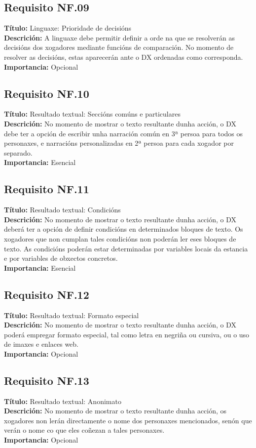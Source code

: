 \subsection{Requisito NF.09}
{\bf Título:} Linguaxe: Prioridade de decisións\\
{\bf Descrición:} A linguaxe debe permitir definir a orde na que se resolverán as decisións dos xogadores mediante funcións de comparación. No momento de resolver as decisións, estas aparecerán ante o DX ordenadas como corresponda.\\
{\bf Importancia:} Opcional

\subsection{Requisito NF.10}
{\bf Título:} Resultado textual: Seccións comúns e particulares\\
{\bf Descrición:} No momento de mostrar o texto resultante dunha acción, o DX debe ter a opción de escribir unha narración común en 3ª persoa para todos os personaxes, e narracións personalizadas en 2ª persoa para cada xogador por separado.\\
{\bf Importancia:} Esencial

\subsection{Requisito NF.11}
{\bf Título:} Resultado textual: Condicións\\
{\bf Descrición:} No momento de mostrar o texto resultante dunha acción, o DX deberá ter a opción de definir condicións en determinados bloques de texto. Os xogadores que non cumplan tales condicións non poderán ler eses bloques de texto. As condicións poderán estar determinadas por variables locais da estancia e por variables de obxectos concretos.\\
{\bf Importancia:} Esencial

\subsection{Requisito NF.12}
{\bf Título:} Resultado textual: Formato especial\\
{\bf Descrición:} No momento de mostrar o texto resultante dunha acción, o DX poderá empregar formato especial, tal como letra en negriña ou cursiva, ou o uso de imaxes e enlaces web.\\
{\bf Importancia:} Opcional

\subsection{Requisito NF.13}
{\bf Título:} Resultado textual: Anonimato\\
{\bf Descrición:} No momento de mostrar o texto resultante dunha acción, os xogadores non lerán directamente o nome dos personaxes mencionados, senón que verán o nome co que eles coñezan a tales personaxes.\\
{\bf Importancia:} Opcional



